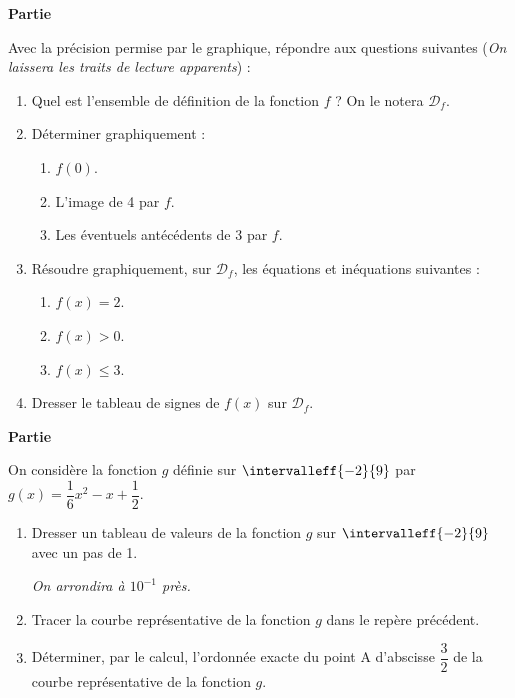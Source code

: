 \documentclass[12pt,french,oneside]{report}
\begin{document}
\begin{spacing}{1.2}
\begin{Exercice}[(9,5 points)]
\textbf{Partie }

Avec la précision permise par le graphique, répondre aux questions suivantes (\textit{On laissera les traits de lecture apparents}) :

\begin{enumerate}
\item Quel est l'ensemble de définition de la fonction $f$ ? On le notera $\mathcal{D}_f$.

\item Déterminer graphiquement :
\begin{enumerate}
\item $f(0)$.

\item L'image de 4 par $f$.

\item Les éventuels antécédents de 3 par $f$.

\end{enumerate}

\item Résoudre graphiquement, sur $\mathcal{D}_f$, les équations et inéquations suivantes :
\begin{enumerate}
\item $f(x)=2$.

\item $f(x)>0$.

\item $f(x)\leq 3$.

\end{enumerate}

\item Dresser le tableau de signes de $f(x)$ sur $\mathcal{D}_f$.
\end{enumerate}

\textbf{Partie }

\medskip

On considère la fonction $g$ définie sur $\intervalleff{-2}{9}$ par $g(x)=\dfrac{1}{6}x^2-x+\dfrac{1}{2}$.

\begin{enumerate}
\item Dresser un tableau de valeurs de la fonction $g$ sur $\intervalleff{-2}{9}$ avec un pas de 1. 

\textit{On arrondira à $10^{-1}$ près.}

\item Tracer la courbe représentative de la fonction $g$ dans le repère précédent.

\item Déterminer, par le calcul, l'ordonnée exacte du point A d'abscisse $\dfrac{3}{2}$ de la courbe représentative de la fonction $g$.


\end{enumerate}
\end{Exercice}
\end{spacing}
\end{document}

